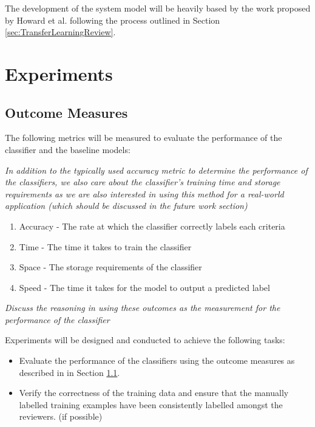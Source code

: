 \documentclass[a4paper,twoside,phd]{BYUPhys}
\begin{document}
The development of the system model will be heavily based by the work proposed by Howard et al. \cite{Howard2018} following the process outlined in Section \ref{sec:TransferLearningReview}.




\section{Experiments}
\label{sec:Experiments}

\subsection{Outcome Measures}
\label{sec:OutcomeMeasures}

The following metrics will be measured to evaluate the performance of the classifier and the baseline models:

\textit{In addition to the typically used accuracy metric to determine the performance of the classifiers, we also care about the classifier's training time and storage requirements as we are also interested in using this method for a real-world application (which should be discussed in the future work section)}

\begin{enumerate}[1)]
	\item Accuracy - The rate at which the classifier correctly labels each criteria
	\item Time - The time it takes to train the classifier
	\item Space - The storage requirements of the classifier
	\item Speed - The time it takes for the model to output a predicted label
\end{enumerate}

\textit{Discuss the reasoning in using these outcomes as the measurement for the performance of the classifier}

Experiments will be designed and conducted to achieve the following tasks:

\begin{itemize}
	\item Evaluate the performance of the classifiers using the outcome measures as described in in Section \ref{sec:OutcomeMeasures}.
	\item Verify the correctness of the training data and ensure that the manually labelled training examples have been consistently labelled amongst the reviewers. (if possible)
\end{itemize} 
\end{document}
